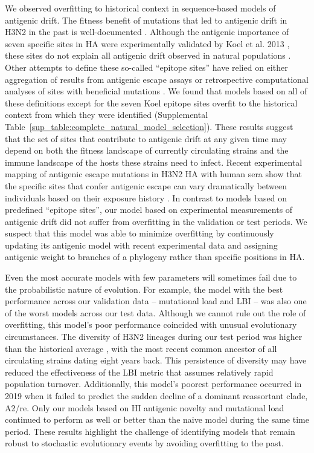 We observed overfitting to historical context in sequence-based models of antigenic drift.
The fitness benefit of mutations that led to antigenic drift in H3N2 in the past is well-documented \cite{Wiley:1981bc,Smith:2004jc,Wolf:2006da,Koel:2013jz}.
Although the antigenic importance of seven specific sites in HA were experimentally validated by Koel et al. 2013 \cite{Koel:2013jz}, these sites do not explain all antigenic drift observed in natural populations \cite{Neher:2016hy}.
Other attempts to define these so-called ``epitope sites'' have relied on either aggregation of results from antigenic escape assays \cite{Wolf:2006da} or retrospective computational analyses of sites with beneficial mutations \cite{Shih:2007bd,Luksza:2014hj}.
We found that models based on all of these definitions except for the seven Koel epitope sites overfit to the historical context from which they were identified (Supplemental Table~\ref{sup_table:complete_natural_model_selection}).
These results suggest that the set of sites that contribute to antigenic drift at any given time may depend on both the fitness landscape of currently circulating strains and the immune landscape of the hosts these strains need to infect.
Recent experimental mapping of antigenic escape mutations in H3N2 HA with human sera show that the specific sites that confer antigenic escape can vary dramatically between individuals based on their exposure history \cite{Lee2019}.
In contrast to models based on predefined ``epitope sites'', our model based on experimental measurements of antigenic drift did not suffer from overfitting in the validation or test periods.
We suspect that this model was able to minimize overfitting by continuously updating its antigenic model with recent experimental data and assigning antigenic weight to branches of a phylogeny rather than specific positions in HA.

Even the most accurate models with few parameters will sometimes fail due to the probabilistic nature of evolution.
For example, the model with the best performance across our validation data -- mutational load and LBI -- was also one of the worst models across our test data.
Although we cannot rule out the role of overfitting, this model's poor performance coincided with unusual evolutionary circumstances.
The diversity of H3N2 lineages during our test period was higher than the historical average \cite{Koelle:2006kf}, with the most recent common ancestor of all circulating strains dating eight years back.
This persistence of diversity may have reduced the effectiveness of the LBI metric that assumes relatively rapid population turnover.
Additionally, this model's poorest performance occurred in 2019 when it failed to predict the sudden decline of a dominant reassortant clade, A2/re.
Only our models based on HI antigenic novelty and mutational load continued to perform as well or better than the naive model during the same time period.
These results highlight the challenge of identifying models that remain robust to stochastic evolutionary events by avoiding overfitting to the past.

